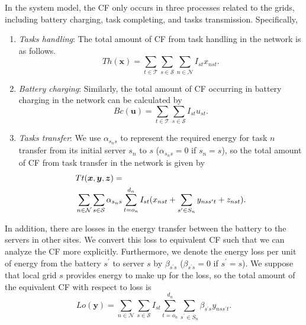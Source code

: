 \documentclass[conference, 10pt, ﬁnal, letterpaper, twocolumn]{IEEEtran}
\begin{document}
In the system model, the CF only occurs in three processes related to the grids, including battery charging, task completing, and tasks transmission. Specifically,
\begin{enumerate}
    \item {\em Tasks handling}: The total amount of CF from task handling in the network is as follows.
    \begin{equation}\label{th}
        Th(\boldsymbol{x}) = \sum_{t \in \mathcal{T}} \sum_{s\in \mathcal{S}} \sum_{n\in \mathcal{N}} I_{st}x_{nst}.
    \end{equation}
    \item {\em Battery charging}: Similarly, the total amount of CF occurring in battery charging in the network can be calculated by
    \begin{equation}\label{bc}
        Bc(\boldsymbol{u}) = \sum_{t \in \mathcal{T}} \sum_{s\in \mathcal{S}} I_{st}u_{st}.
    \end{equation}
    \item {\em Tasks transfer}: We use $\alpha_{s_n s}$ to represent the required energy for task $n$ transfer from its initial server $s_n$ to $s$ ($\alpha_{s_n s} = 0$ if $s_n = s$), so the total amount of CF from task transfer in the network is given by
    \begin{align}\label{tt}
        &Tt(\boldsymbol{x}, \boldsymbol{y}, \boldsymbol{z}) = \notag \\
        & \sum_{n \in \mathcal{N}} \sum_{s \in \mathcal{S}} \alpha_{s_n s} \sum^{d_n}_{t = o_n} I_{st} ( x_{nst} + \sum_{s^\prime \in S_n}  y _{nss^\prime t} + z_{nst}).
    \end{align}
\end{enumerate}
In addition, there are losses in the energy transfer between the battery to the servers in other sites. We convert this loss to equivalent CF such that we can analyze the CF more explicitly. Furthermore, we denote the energy loss per unit of energy from the battery $s^\prime$ to server $s$ by $\beta_{s^\prime s}$ ($\beta_{s^\prime s} = 0$ if $s^\prime = s$). We suppose that local grid $s$ provides energy to make up for the loss, so the total amount of the equivalent CF with respect to loss is 
\begin{equation}\label{lo}
    Lo(\boldsymbol{y}) = \sum_{n \in \mathcal{N}} \sum_{s \in \mathcal{S}} I_{st} \sum^{d_n}_{t = o_n}\sum_{s^\prime \in S_n}  \beta_{s^\prime s}  y _{nss^\prime t}.
\end{equation}
\end{document}
